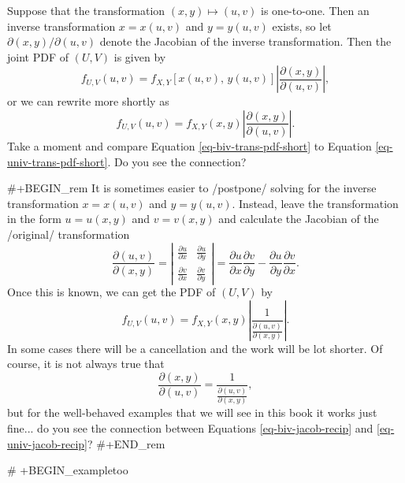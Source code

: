 Suppose that the transformation \((x,y)\longmapsto(u,v)\) is
one-to-one. Then an inverse transformation \(x=x(u,v)\) and
\(y=y(u,v)\) exists, so let \(\partial(x,y)/\partial(u,v)\) denote the
Jacobian of the inverse transformation. Then the joint PDF of
\((U,V)\) is given by
\begin{equation}
f_{U,V}(u,v)=f_{X,Y}\left[x(u,v),\, y(u,v)\right]\left|\frac{\partial(x,y)}{\partial(u,v)}\right|,
\end{equation}
or we can rewrite more shortly as
\begin{equation}
\label{eq-biv-trans-pdf-short}
f_{U,V}(u,v)=f_{X,Y}(x,y)\left|\frac{\partial(x,y)}{\partial(u,v)}\right|.
\end{equation}
Take a moment and compare Equation \eqref{eq-biv-trans-pdf-short} to Equation
\eqref{eq-univ-trans-pdf-short}. Do you see the connection?

#+BEGIN_rem
It is sometimes easier to /postpone/ solving for the inverse
transformation \(x=x(u,v)\) and \(y=y(u,v)\). Instead, leave the
transformation in the form \(u=u(x,y)\) and \(v=v(x,y)\) and calculate
the Jacobian of the /original/ transformation
\begin{equation}
\frac{\partial(u,v)}{\partial(x,y)}=\left|\begin{array}{cc}
\frac{\partial u}{\partial x} & \frac{\partial u}{\partial y}\\
\frac{\partial v}{\partial x} & \frac{\partial v}{\partial y}\end{array}\right|=\frac{\partial u}{\partial x}\frac{\partial v}{\partial y}-\frac{\partial u}{\partial y}\frac{\partial v}{\partial x}.
\end{equation}
Once this is known, we can get the PDF of \((U,V)\) by
\begin{equation}
f_{U,V}(u,v)=f_{X,Y}(x,y)\left|\frac{1}{\frac{\partial(u,v)}{\partial(x,y)}}\right|.
\end{equation}
In some cases there will be a cancellation and the work will be lot
shorter. Of course, it is not always true that
\begin{equation}
\label{eq-biv-jacob-recip}
\frac{\partial(x,y)}{\partial(u,v)}=\frac{1}{\frac{\partial(u,v)}{\partial(x,y)}},
\end{equation}
but for the well-behaved examples that we will see in this book it
works just fine... do you see the connection between Equations
\eqref{eq-biv-jacob-recip} and \eqref{eq-univ-jacob-recip}?
#+END_rem


# +BEGIN_exampletoo

